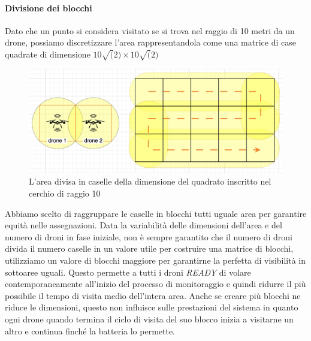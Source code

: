 \documentclass[a4paper, 11pt]{article}
\begin{document}
\paragraph*{Divisione dei blocchi}
Dato che un punto si considera visitato se si trova nel raggio di 10 metri da un drone, possiamo discretizzare l'area rappresentandola come una matrice di case quadrate di dimensione $10\sqrt(2) \times 10\sqrt(2)$
\begin{figure}[h]
    \centering
    \includegraphics[height = 5 cm]{image/areedroni.png}
    \caption{L'area divisa in caselle della dimensione del quadrato inscritto nel cerchio di raggio 10}
\end{figure}

Abbiamo scelto di raggruppare le caselle in blocchi tutti uguale area per garantire equità nelle assegnazioni. 
Data la variabilità delle dimensioni dell'area e del numero di droni in fase iniziale, non è sempre garantito che il numero di droni divida il numero caselle in un valore utile per costruire una matrice di blocchi, utilizziamo un valore di blocchi maggiore per garantirne la perfetta di visibilità in sottoaree uguali.
Questo permette a tutti i droni \textit{READY} di volare contemporaneamente all'inizio del processo di monitoraggio e quindi ridurre il più possibile il tempo di visita medio dell'intera area.
Anche se creare più blocchi ne riduce le dimensioni, questo non influisce sulle prestazioni del sistema in quanto ogni drone quando termina il ciclo di visita del suo blocco inizia a visitarne un altro e continua finché la batteria lo permette.
\end{document}
